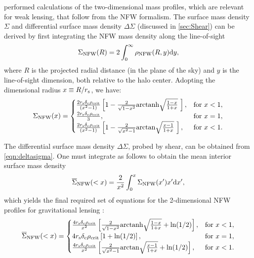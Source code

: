 \citet{Wright00} performed calculations of the two-dimensional mass profiles, which are relevant for weak lensing, that follow from the \ac{NFW} formalism. The surface mass density $\Sigma$ and differential surface mass density $\Delta\Sigma$ (discussed in \autoref{sec:Shear}) can be derived by first integrating the \ac{NFW} mass density along the line-of-sight
\begin{equation}
\Sigma_{\rm NFW} (R) = 2 \int_0^{\infty} \rho_{\rm NFW} (R,y) {\rm d}y,
\end{equation}
where $R$ is the projected radial distance (in the plane of the sky) and $y$ is the line-of-sight dimension, both relative to the halo center. Adopting the dimensional radius $x \equiv R/r_{\rm s}$, we have:
\begin{equation}
\Sigma_{\rm NFW} (x) = 
    \begin{cases}
        \frac{2 r_{\rm s} \delta_{\rm c} \rho_{\rm crit}}{(x^2 - 1)} \left[ 1 - \frac{2}{\sqrt{1-x^2}} {\rm arctanh} \sqrt{\frac{1-x}{1+x}} \ \right], & \text{for } x < 1, \\
        \frac{2 r_{\rm s} \delta_{\rm c} \rho_{\rm crit}}{3},              & \text{for } x = 1, \\
        \frac{2 r_{\rm s} \delta_{\rm c} \rho_{\rm crit}}{(x^2 - 1)} \left[ 1 - \frac{2}{\sqrt{x^2 - 1}} {\rm arctan} \sqrt{\frac{x-1}{1+x}} \ \right], & \text{for } x < 1.
    \end{cases}
\end{equation}

The differential surface mass density $\Delta\Sigma$, probed by shear, can be obtained from  \autoref{eqn:deltasigma}. One must integrate as follows to obtain the mean interior surface mass density
\begin{equation}
\overline{\Sigma}_{\rm NFW}(<x) = \frac{2}{x^2} \int_0^{x} \Sigma_{\rm NFW}(x') x' {\rm d}x',
\end{equation}
which yields the final required set of equations for the 2-dimensional \ac{NFW} profiles for gravitational lensing \citep{Wright00}:
\begin{equation}
\overline{\Sigma}_{\rm NFW}(<x) = 
    \begin{cases}
        \frac{4 r_{\rm s} \delta_{\rm c} \rho_{\rm crit}}{x^2} \left[ \frac{2}{\sqrt{1-x^2}} {\rm arctanh} \sqrt{\frac{1-x}{1+x}} + {\rm ln}(1/2) \right], & \text{for } x < 1, \\
        4 r_{\rm s} \delta_{\rm c} \rho_{\rm crit} \left[ 1 + {\rm ln}(1/2) \right], & \text{for } x = 1, \\
        \frac{4 r_{\rm s} \delta_{\rm c} \rho_{\rm crit}}{x^2} \left[ \frac{2}{\sqrt{x^2 - 1}} {\rm arctan} \sqrt{\frac{x-1}{1+x}} + {\rm ln}(1/2) \right], & \text{for } x < 1.
    \end{cases}
\end{equation}

